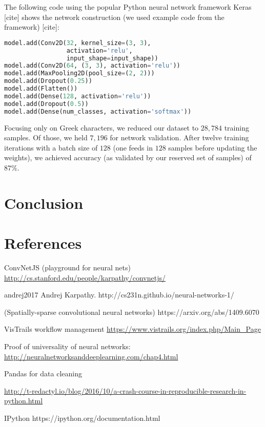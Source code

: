 \documentclass[12pt,letterpaper,boxed]{article}
\begin{document}
		The following code using the popular Python neural network framework Keras [cite] shows the network construction (we used example code from the framework) [cite]:
		
		\begin{lstlisting}[language=Python]
model.add(Conv2D(32, kernel_size=(3, 3),
                 activation='relu',
                 input_shape=input_shape))
model.add(Conv2D(64, (3, 3), activation='relu'))
model.add(MaxPooling2D(pool_size=(2, 2)))
model.add(Dropout(0.25))
model.add(Flatten())
model.add(Dense(128, activation='relu'))
model.add(Dropout(0.5))
model.add(Dense(num_classes, activation='softmax'))
		\end{lstlisting}

		Focusing only on Greek characters, we reduced our dataset to  $28,784$ training samples. Of those, we held $7,196$ for network validation. After twelve training iterations with a batch size of $128$ (one feeds in $128$ samples before updating the weights), we achieved accuracy (as validated by our reserved set of samples) of $87\%$. 

\section{Conclusion}

\section{References}
ConvNetJS (playground for neural nets)
\url{http://cs.stanford.edu/people/karpathy/convnetjs/}

andrej2017
Andrej Karpathy. http://cs231n.github.io/neural-networks-1/

(Spatially-sparse convolutional neural networks) https://arxiv.org/abs/1409.6070

VisTrails workflow management
\url{https://www.vistrails.org/index.php/Main_Page}

Proof of universality of neural networks:
\url{http://neuralnetworksanddeeplearning.com/chap4.html}


Pandas for data cleaning

\url{http://t-redactyl.io/blog/2016/10/a-crash-course-in-reproducible-research-in-python.html}

IPython
https://ipython.org/documentation.html
\end{document}
